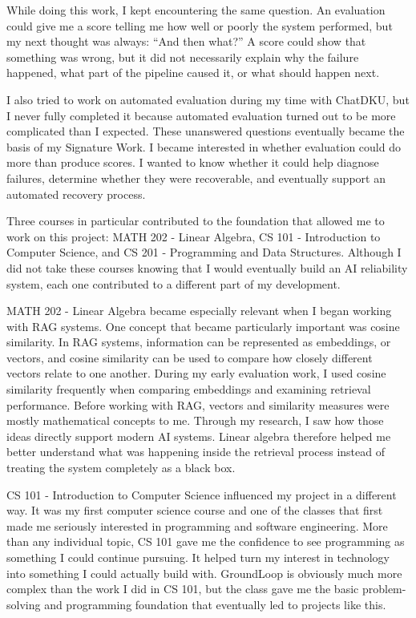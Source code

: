 \documentclass[12pt, a4paper, oneside]{report}
\begin{document}
While doing this work, I kept encountering the same question. An evaluation could give me a score telling me how well or poorly the system performed, but my next thought was always: ``And then what?'' A score could show that something was wrong, but it did not necessarily explain why the failure happened, what part of the pipeline caused it, or what should happen next.

I also tried to work on automated evaluation during my time with ChatDKU, but I never fully completed it because automated evaluation turned out to be more complicated than I expected. These unanswered questions eventually became the basis of my Signature Work. I became interested in whether evaluation could do more than produce scores. I wanted to know whether it could help diagnose failures, determine whether they were recoverable, and eventually support an automated recovery process.

Three courses in particular contributed to the foundation that allowed me to work on this project: MATH 202 - Linear Algebra, CS 101 - Introduction to Computer Science, and CS 201 - Programming and Data Structures. Although I did not take these courses knowing that I would eventually build an AI reliability system, each one contributed to a different part of my development.

MATH 202 - Linear Algebra became especially relevant when I began working with RAG systems. One concept that became particularly important was cosine similarity. In RAG systems, information can be represented as embeddings, or vectors, and cosine similarity can be used to compare how closely different vectors relate to one another. During my early evaluation work, I used cosine similarity frequently when comparing embeddings and examining retrieval performance. Before working with RAG, vectors and similarity measures were mostly mathematical concepts to me. Through my research, I saw how those ideas directly support modern AI systems. Linear algebra therefore helped me better understand what was happening inside the retrieval process instead of treating the system completely as a black box.

CS 101 - Introduction to Computer Science influenced my project in a different way. It was my first computer science course and one of the classes that first made me seriously interested in programming and software engineering. More than any individual topic, CS 101 gave me the confidence to see programming as something I could continue pursuing. It helped turn my interest in technology into something I could actually build with. GroundLoop is obviously much more complex than the work I did in CS 101, but the class gave me the basic problem-solving and programming foundation that eventually led to projects like this.
\end{document}
